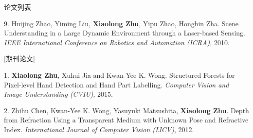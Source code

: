 \documentclass[UTF8]{cv_professional-cn} %
\makeatletter
\newlength{\bibhang}
\newlength{\bibsep}
 {\@listi \global\bibsep\itemsep \global\advance\bibsep by\parsep}
\newenvironment{bibsection}%
        {\vspace{\itemsep}\begin{list}{}{%
       \setlength{\leftmargin}{\bibhang}%
       \setlength{\itemsep}{\bibsep}%
       \setlength{\parsep}{\z@}%
        \setlength{\partopsep}{0pt}%
        \setlength{\topsep}{0pt}}}
        {\end{list}\vspace{\itemsep}}
\makeatother
\begin{document}
\begin{rSection}{论文列表}
\begin{bibsection}
	\item[9.] Huijing Zhao, Yiming Liu,\textbf{ Xiaolong Zhu}, Yipu Zhao, Hongbin Zha. Scene Understanding in a Large Dynamic Environment through a Laser-based Sensing. \emph{IEEE International Conference on Robotics and Automation (ICRA)}, 2010.
\end{bibsection}

[期刊论文]

\begin{bibsection}
	\item[1.] \textbf{Xiaolong Zhu}, Xuhui Jia and Kwan-Yee K. Wong. Structured Forests for Pixel-level Hand Detection and Hand Part Labelling. \emph{Computer Vision and Image Understanding (CVIU)}, 2015.

  \item[2.] Zhihu Chen, Kwan-Yee K. Wong, Yasuyuki Matsushita, \textbf{Xiaolong Zhu}. Depth from Refraction Using a Transparent Medium with Unknown Pose and Refractive Index. \emph{International Journal of Computer Vision (IJCV)}, 2012.

\end{bibsection}

\end{rSection}


\end{document}

